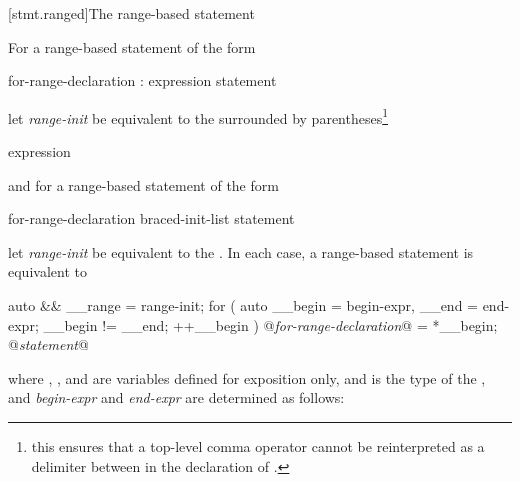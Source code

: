 [stmt.ranged]{The range-based  statement}%

\pnum
For a range-based  statement of the form

\begin{ncbnf}
 for-range-declaration : expression \terminal{)} statement
\end{ncbnf}

let \textit{range-init} be equivalent to the  surrounded
by parentheses\footnote{this ensures that a top-level comma operator cannot be
reinterpreted as a delimiter between  in the
declaration of .}

\begin{ncbnf}
\terminal{(} expression \terminal{)}
\end{ncbnf}

and for a range-based  statement of the form

\begin{ncbnf}
 \terminal{(} for-range-declaration \terminal{:} braced-init-list \terminal{)} statement
\end{ncbnf}

let \textit{range-init} be equivalent to the . In each case, a
range-based  statement
is equivalent to

\begin{codeblock}
{
  auto && __range = range-init;
  for ( auto __begin = begin-expr,
             __end = end-expr;
        __begin != __end;
        ++__begin ) {
    @\textit{for-range-declaration}@ = *__begin;
    @\textit{statement}@
  }
}
\end{codeblock}

where , , and  are variables defined for
exposition only, and  is the type of the
, and \textit{begin-expr} and \textit{end-expr} are
determined as follows:

